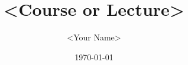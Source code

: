 \documentclass[11pt,a4paper]{article}
\title{<Course or Lecture>}
\author{<Your Name>}
\date{\today}
\begin{document}
\maketitle
\tableofcontents
\bigskip


\end{document}
